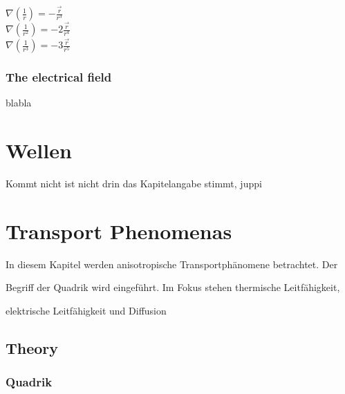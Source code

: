 \documentclass[a4paper]{scrartcl}
\begin{document}
$ \nabla(\frac{1}{r}) = -\frac{\vec{r}}{r^3}$
\\
$ \nabla(\frac{1}{r^2}) = -2\frac{\vec{r}}{r^4}$
\\
$ \nabla(\frac{1}{r^3}) = -3\frac{\vec{r}}{r^5}$

\subsubsection{The electrical field}
blabla


\section{Wellen}

Kommt nicht ist nicht drin das Kapitelangabe stimmt, juppi





\section{Transport Phenomenas}

In diesem Kapitel werden anisotropische Transportphänomene betrachtet. Der

Begriff der Quadrik wird eingeführt. Im Fokus stehen thermische Leitfähigkeit,

elektrische Leitfähigkeit und Diffusion

\subsection{Theory}

\subsubsection{Quadrik}
\end{document}
